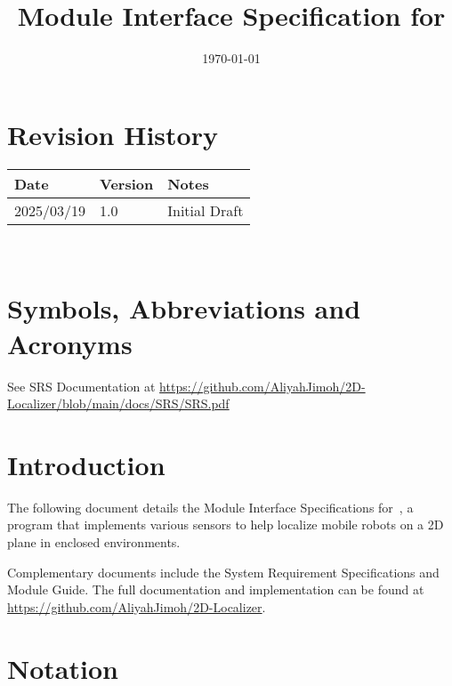 \documentclass[12pt, titlepage]{article}
\begin{document}
\title{Module Interface Specification for \progname{}}

\author{\authname}

\date{\today}

\maketitle


\section{Revision History}

\begin{tabularx}{\textwidth}{p{3cm}p{2cm}X}
\toprule {\bf Date} & {\bf Version} & {\bf Notes}\\
\midrule
2025/03/19 & 1.0 & Initial Draft\\
\bottomrule
\end{tabularx}

~\newpage

\section{Symbols, Abbreviations and Acronyms}

See SRS Documentation at \url{https://github.com/AliyahJimoh/2D-Localizer/blob/main/docs/SRS/SRS.pdf}


\newpage

\tableofcontents

\newpage


\section{Introduction}

The following document details the Module Interface Specifications for~\progname, a program that implements various sensors to help localize mobile robots on a 2D plane in enclosed environments.

Complementary documents include the System Requirement Specifications
and Module Guide.  The full documentation and implementation can be
found at \url{https://github.com/AliyahJimoh/2D-Localizer}.

\section{Notation}
\end{document}
